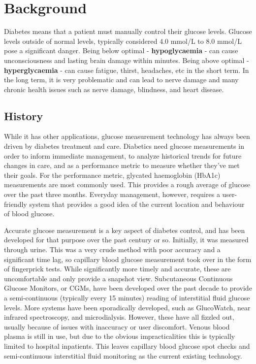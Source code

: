 \chapter{Background}

Diabetes means that a patient must manually control their glucose levels. Glucose levels outside of normal levels, typically considered 4.0 mmol/L to 8.0 mmol/L pose a significant danger. Being below optimal -  \textbf{hypoglycaemia} - can cause unconsciousness and lasting brain damage within minutes. Being above optimal - \textbf{hyperglycaemia} -  can cause fatigue, thirst, headaches, etc in the short term. In the long term, it is very problematic and can lead to nerve damage and many chronic health issues such as nerve damage, blindness, and heart disease. 

\section{History}

While it has other applications, glucose measurement technology has always been driven by diabetes treatment and care. Diabetics need glucose measurements in order to inform immediate management, to analyze historical trends for future changes in care, and as a performance metric to measure whether they’ve met their goals. For the performance metric, glycated haemoglobin (HbA1c) measurements are most commonly used. This provides a rough average of glucose over the past three months. Everyday management, however, requires a user-friendly system that provides a good idea of the current location and behaviour of blood glucose.

Accurate glucose measurement is a key aspect of diabetes control, and has been developed for that purpose over the past century or so. Initially, it was measured through urine. This was a very crude method with poor accuracy and a significant time lag, so capillary blood glucose measurement took over in the form of fingerprick tests. While significantly more timely and accurate, these are uncomfortable and only provide a snapshot view. Subcutaneous Continuous Glucose Monitors, or CGMs, have been developed over the past decade to provide a semi-continuous (typically every 15 minutes) reading of interstitial fluid glucose levels. More systems have been sporadically developed, such as GlucoWatch, near infrared spectroscopy, and microdialysis. However, these have all fizzled out, usually because of issues with inaccuracy or user discomfort. Venous blood plasma is still in use, but due to the obvious impracticalities this is typically limited to hospital inpatients. This leaves capillary blood glucose spot checks and semi-continuous interstitial fluid monitoring as the current existing technology.  

